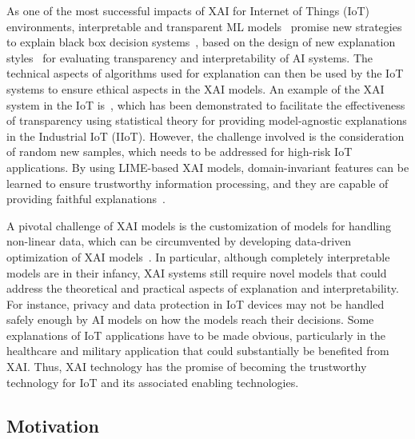 \documentclass[journal]{IEEEtran}
\begin{document}
As one of the most successful impacts of XAI for Internet of Things (IoT) environments, interpretable and transparent ML models~\cite{lipton2018mythos} promise new strategies to explain black box decision systems~\cite{guidotti2018survey}, based on the design of new explanation styles~\cite{van2021evaluating} for evaluating transparency and interpretability of AI systems. The technical aspects of algorithms used for explanation can then be used by the IoT systems to ensure ethical aspects in the XAI models. An example of the XAI system in the IoT is~\cite{zolanvari2021trust}, which has been demonstrated to facilitate the effectiveness of transparency using statistical theory for providing model-agnostic explanations in the Industrial IoT (IIoT). However, the challenge involved is the consideration of random new samples, which needs to be addressed for high-risk IoT applications. By using LIME-based XAI models, domain-invariant features can be learned to ensure trustworthy information processing, and they are capable of providing faithful explanations~\cite{walambe2022explainable}.

A pivotal challenge of XAI models is the customization of models for handling non-linear data, which can be circumvented by developing data-driven optimization of XAI models~\cite{hewitt2020data}. In particular, although completely interpretable models are in their infancy, XAI systems still require novel models that could address the theoretical and practical aspects of explanation and interpretability. For instance, privacy and data protection in IoT devices may not be handled safely enough by AI models on how the models reach their decisions. Some explanations of IoT applications have to be made obvious, particularly in the healthcare and military application that could substantially be benefited from XAI. Thus, XAI technology has the promise of becoming the trustworthy technology for IoT and its associated enabling technologies.

\subsection{Motivation}
\end{document}
